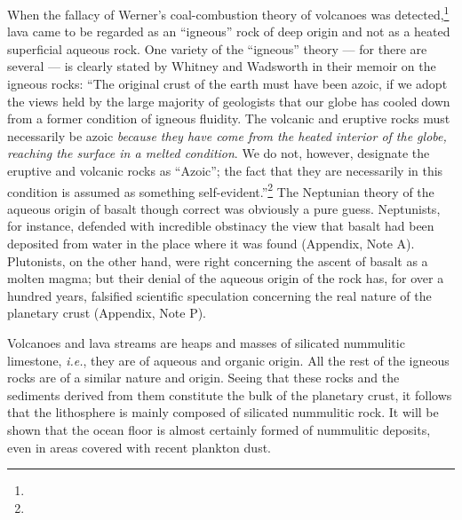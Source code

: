 \documentclass[a4paper, 12pt, oneside]{article}
\begin{document}
When the fallacy of Werner's coal-combustion theory of volcanoes was detected,\footnote{} lava came to be regarded as an ``igneous'' rock of deep origin and not as a heated superficial aqueous rock. One variety of the ``igneous'' theory --- for there are several --- is clearly stated by Whitney and Wadsworth in their memoir on the igneous rocks: ``The original crust of the earth must have been azoic, if we adopt the views held by the large majority of geologists that our globe has cooled down from a former condition of igneous fluidity. The volcanic and eruptive rocks must necessarily be azoic \emph{because they have come from the heated interior of the globe, reaching the surface in a melted condition}. We do not, however, designate the eruptive and volcanic rocks as ``Azoic''; the fact that they are necessarily in this condition is assumed as something self-evident.''\footnote{} The Neptunian theory of the aqueous origin of basalt though correct was obviously a pure guess. Neptunists, for instance, defended with incredible obstinacy the view that basalt had been deposited from water in the place where it was found (Appendix, Note A). Plutonists, on the other hand, were right concerning the ascent of basalt as a molten magma; but their denial of the aqueous origin of the rock has, for over a hundred years, falsified scientific speculation concerning the real nature of the planetary crust (Appendix, Note P).

Volcanoes and lava streams are heaps and masses of silicated nummulitic limestone, \emph{i.e.}, they are of aqueous and organic origin. All the rest of the igneous rocks are of a similar nature and origin. Seeing that these rocks and the sediments derived from them constitute the bulk of the planetary crust, it follows that the lithosphere is mainly composed of silicated nummulitic rock. It will be shown that the ocean floor is almost certainly formed of nummulitic deposits, even in areas covered with recent plankton dust.
\end{document}

